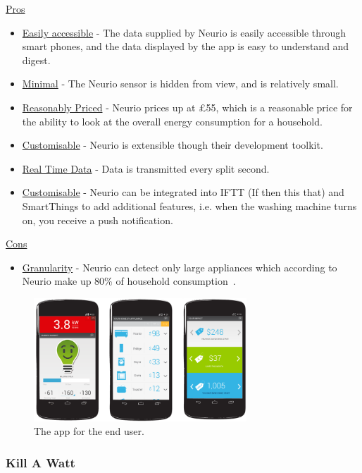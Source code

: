 \documentclass[draft,preprint,12pt,3p]{elsarticle}
\begin{document}
\begin{center}
\underline{Pros}
\begin{itemize}
        \item \underline{Easily accessible} - The data supplied by Neurio is easily accessible through smart phones, and the data displayed by the app is easy to understand and digest.
    \item \underline{Minimal} - The Neurio sensor is hidden from view, and is relatively small.
    \item \underline{Reasonably Priced} - Neurio prices up at \pounds55, which is a reasonable price for the ability to look at the overall energy consumption for a household. 
    \item \underline{Customisable} - Neurio is extensible though their development toolkit.
    \item \underline{Real Time Data} - Data is transmitted every split second.
    \item \underline{Customisable} - Neurio can be integrated into IFTT (If then this that) and SmartThings to add additional features, i.e. when the washing machine turns on, you receive a push notification.
\end{itemize}
    
\underline{Cons}
\begin{itemize}
    \item \underline{Granularity} - Neurio can detect only large appliances which according to Neurio make up 80\% of household consumption~\cite{neurioaccuracy}.

\end{itemize}
    
\end{center}

\begin{figure}[H]
    \centering
    \includegraphics[width=8cm]{existing/neurio-app}
    \caption {The app for the end user.}
\end{figure}


\subsubsection{Kill A Watt}
\end{document}
